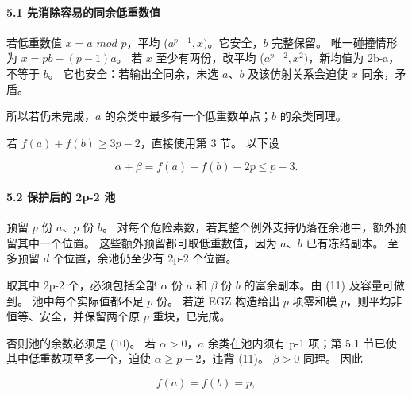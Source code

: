 \documentclass[11pt,a4paper]{article}
\theoremstyle{definition}
\numberwithin{equation}{section}
\begin{document}
\paragraph*{\texorpdfstring{{5.1} {先消除容易的同余低重数值}}{5.1 先消除容易的同余低重数值}}\label{C4-h24}

{若低重数值} {\ensuremath{x=a}} {\ensuremath{mod}} {\ensuremath{p}，平均} {(\ensuremath{a^{p-1},x)}。它安全，\ensuremath{b}} {完整保留。} {唯一碰撞情形为} {\ensuremath{x=pb-(p-1)a}。} {若} {\ensuremath{x}} {至少有两份，改平均} {(\ensuremath{a^{p-2},x^{2})}，新均值为} {2b-a，不等于} {\ensuremath{b}。} {它也安全：若输出全同余，未选} {\ensuremath{a}、\ensuremath{b}} {及该仿射关系会迫使} {\ensuremath{x}} {同余，矛盾。}

{所以若仍未完成，\ensuremath{a}} {的余类中最多有一个低重数单点；\ensuremath{b}} {的余类同理。}

{若} {\ensuremath{f(a)+f(b)\ge 3p-2}，直接使用第} {3} {节。} {以下设}

\[
\alpha+\beta=f(a)+f(b)-2p\le p-3.
\tag{C4.11}
\]

\paragraph*{\texorpdfstring{{5.2} {保护后的} {2p-2} {池}}{5.2 保护后的 2p-2 池}}\label{C4-h25}

{预留} {\ensuremath{p}} {份} {\ensuremath{a}、\ensuremath{p}} {份} {\ensuremath{b}。} {对每个危险素数，若其整个例外支持仍落在余池中，额外预留其中一个位置。} {这些额外预留都可取低重数值，因为} {\ensuremath{a}、\ensuremath{b}} {已有冻结副本。} {至多预留} {\ensuremath{d}} {个位置，余池仍至少有} {2p-2} {个位置。}

{取其中} {2p-2} {个，必须包括全部} {\ensuremath{\alpha }} {份} {\ensuremath{a}} {和} {\ensuremath{\beta }} {份} {\ensuremath{b}} {的富余副本。由} {(11)} {及容量可做到。} {池中每个实际值都不足} {\ensuremath{p}} {份。} {若逆} {EGZ} {构造给出} {\ensuremath{p}} {项零和模} {\ensuremath{p}，则平均非恒等、安全，并保留两个原} {\ensuremath{p}} {重块，已完成。}

{否则池的余数必须是} {(10)。} {若} {\ensuremath{\alpha >0}，\ensuremath{a}} {余类在池内须有} {p-1} {项；第} {5.1} {节已使其中低重数项至多一个，迫使} {\ensuremath{\alpha \ge p-2}，违背} {(11)。} {\ensuremath{\beta >0}} {同理。} {因此}

\[
f(a)=f(b)=p,
\]
\end{document}
